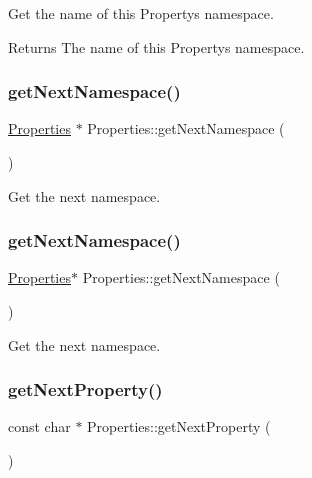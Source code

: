 Get the name of this Property\textquotesingle{}s namespace.

\begin{DoxyReturn}{Returns}
The name of this Property\textquotesingle{}s namespace. 
\end{DoxyReturn}
\mbox{\label{classProperties_af3933a1797582540f81ef13a981801d3}} 
\subsubsection{\texorpdfstring{get\+Next\+Namespace()}{getNextNamespace()}\hspace{0.1cm}{\footnotesize\ttfamily [1/2]}}
{\footnotesize\ttfamily \hyperlink{classProperties}{Properties} $\ast$ Properties\+::get\+Next\+Namespace (\begin{DoxyParamCaption}{ }\end{DoxyParamCaption})}

Get the next namespace. \mbox{\label{classProperties_aa5db87165b6b56f6ad0a2d4e8b95a6f9}} 
\subsubsection{\texorpdfstring{get\+Next\+Namespace()}{getNextNamespace()}\hspace{0.1cm}{\footnotesize\ttfamily [2/2]}}
{\footnotesize\ttfamily \hyperlink{classProperties}{Properties}$\ast$ Properties\+::get\+Next\+Namespace (\begin{DoxyParamCaption}{ }\end{DoxyParamCaption})}

Get the next namespace. \mbox{\label{classProperties_a396aad2d114059ca157db26c511da196}} 
\subsubsection{\texorpdfstring{get\+Next\+Property()}{getNextProperty()}\hspace{0.1cm}{\footnotesize\ttfamily [1/2]}}
{\footnotesize\ttfamily const char $\ast$ Properties\+::get\+Next\+Property (\begin{DoxyParamCaption}{ }\end{DoxyParamCaption})}


